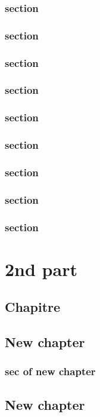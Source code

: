 \documentclass[11pt,table]{book}
\begin{document}
\section{section}
\section{section}
\section{section}
\section{section}
\section{section}
\section{section}
\section{section}
\section{section}
\section{section}

\part{2nd part}
\chapter{Chapitre}
\chapter{New chapter}
 \section{sec of new chapter}

\chapter{New chapter}
\end{document}

